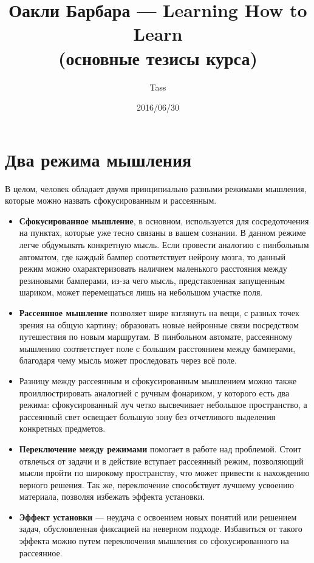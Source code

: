 \documentclass{article}
\begin{document}
\title{Оакли Барбара --- Learning How to Learn\\(основные тезисы курса)}
\author{Tass}
\date{2016/06/30}
\maketitle

\section{Два режима мышления}
В целом, человек обладает двумя принципиально разными режимами мышления, которые можно назвать сфокусированным и рассеянным.

\begin{itemize}
\item \textbf{Сфокусированное мышление}, в основном, используется для сосредоточения на пунктах, которые уже тесно связаны в вашем сознании. В данном режиме легче обдумывать конкретную мысль. Если провести аналогию с пинбольным автоматом, где каждый бампер соответствует нейрону мозга, то данный режим можно охарактеризовать наличием маленького расстояния между резиновыми бамперами, из-за чего мысль, представленная запущенным шариком, может перемещаться лишь на небольшом участке поля.
\item \textbf{Рассеянное мышление} позволяет шире взглянуть на вещи, с разных точек зрения на общую картину; образовать новые нейронные связи посредством путешествия по новым маршрутам. В пинбольном автомате, рассеянному мышлению соответствует поле с большим расстоянием между бамперами, благодаря чему мысль может проследовать через всё поле.
\item Разницу между рассеянным и сфокусированным мышлением можно также проиллюстрировать аналогией с ручным фонариком, у которого есть два режима: сфокусированный луч четко высвечивает небольшое пространство, а рассеянный свет освещает большую зону без отчетливого выделения конкретных предметов.
\item \textbf{Переключение между режимами} помогает в работе над проблемой. Стоит отвлечься от задачи и в действие вступает рассеянный режим, позволяющий мысли пройти по широкому пространству, что может привести к нахождению верного решения. Так же, переключение способствует лучшему усвоению материала, позволяя избежать эффекта установки.
\item \textbf{Эффект установки} --- неудача с освоением новых понятий или решением задач, обусловленная фиксацией на неверном подходе. Избавиться от такого эффекта можно путем переключения мышления со сфокусированного на рассеянное.
\end{itemize}
\end{document}
